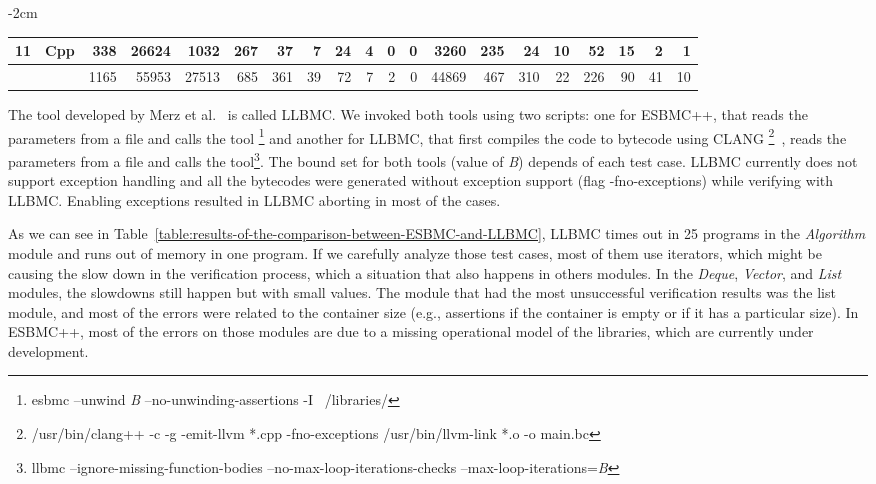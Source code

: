\documentclass[a4paper]{llncs}
\begin{document}
\begin{table*}[t!]
\begin{adjustwidth}{-2cm}{}
\begin{center}
{\begin{tabular}{|c|l|r|r||r|r|r|r|r|r|r|r|r|r|r|r|r|r|r|r|}
\hline
11 & Cpp        & 338  & 26624 & 1032  & 267  & 37  & 7   & 24   & 4    & 0    & 0     & 3260   & 235 & 24  & 10  & 52  & 15   & 2   & 1\\ %
\hline\hline
  &             & 1165 & 55953 & 27513 & 685  & 361   & 39   & 72  & 7  & 2    & 0     & 44869  & 467 & 310 & 22  & 226 & 90   & 41  & 10\\ %
\hline
\end{tabular} }
\end{center}
\caption{Results of the comparison between ESBMC v1.20 and LLBMC v2012.2a.}
\label{table:results-of-the-comparison-between-ESBMC-and-LLBMC}
\end{adjustwidth}
\end{table*}

The tool developed by Merz et al.~\cite{Florian12} is called LLBMC.
We invoked both tools using two scripts: one for ESBMC++, that reads
the parameters from a file and calls the tool
\footnote[1]{esbmc --unwind \textit{B} --no-unwinding-assertions -I ~/libraries/}
and another for LLBMC, that first compiles the code to bytecode using CLANG
\footnote[2]{/usr/bin/clang++ -c -g -emit-llvm *.cpp -fno-exceptions \newline /usr/bin/llvm-link *.o -o main.bc}~\cite{CLANG},
reads the parameters from a file and calls the tool\footnote[3]
{llbmc --ignore-missing-function-bodies --no-max-loop-iterations-checks --max-loop-iterations=\textit{B}}.
The bound set for both tools (value of \textit{B}) depends of each test case.
LLBMC currently does not support exception handling and all the bytecodes were generated without
exception support (flag -fno-exceptions) while verifying with LLBMC.
Enabling exceptions resulted in LLBMC aborting in most of the cases.

As we can see in Table~\ref{table:results-of-the-comparison-between-ESBMC-and-LLBMC},
LLBMC times out in 25 programs in the \textit{Algorithm} module and
runs out of memory in one program. If we carefully analyze those test cases,
most of them use iterators, which might be causing the slow down
in the verification process, which a situation that also happens in others modules.
In the \textit{Deque}, \textit{Vector}, and \textit{List} modules,
the slowdowns still happen but with small values. The module that had the
most unsuccessful verification results was the list module, and most of the
errors were related to the container size (e.g., assertions if the container
is empty or if it has a particular size). In ESBMC++, most of the errors on
those modules are due to a missing operational model
of the libraries, which are currently under development.
\end{document}

